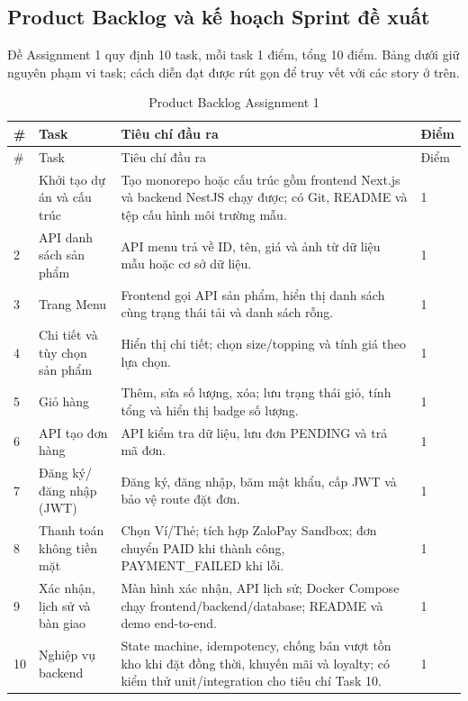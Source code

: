 \subsection{Product Backlog và kế hoạch Sprint đề xuất}
Đề Assignment 1 quy định 10 task, mỗi task 1 điểm, tổng 10 điểm. Bảng dưới giữ nguyên phạm vi task; cách diễn đạt được rút gọn để truy vết với các story ở trên.

\begin{longtable}{@{}p{0.55cm}p{3.15cm}p{9.9cm}p{1.05cm}@{}}
\caption{Product Backlog Assignment 1}\label{tab:a1-product-backlog}\\
\toprule
\# & Task & Tiêu chí đầu ra & Điểm \\
\midrule
\endfirsthead
\toprule \# & Task & Tiêu chí đầu ra & Điểm \\
\midrule
\endhead
\bottomrule
\endfoot
1 & Khởi tạo dự án và cấu trúc & Tạo monorepo hoặc cấu trúc gồm frontend Next.js và backend NestJS chạy được; có Git, README và tệp cấu hình môi trường mẫu. & 1 \\
2 & API danh sách sản phẩm & API menu trả về ID, tên, giá và ảnh từ dữ liệu mẫu hoặc cơ sở dữ liệu. & 1 \\
3 & Trang Menu & Frontend gọi API sản phẩm, hiển thị danh sách cùng trạng thái tải và danh sách rỗng. & 1 \\
4 & Chi tiết và tùy chọn sản phẩm & Hiển thị chi tiết; chọn size/topping và tính giá theo lựa chọn. & 1 \\
5 & Giỏ hàng & Thêm, sửa số lượng, xóa; lưu trạng thái giỏ, tính tổng và hiển thị badge số lượng. & 1 \\
6 & API tạo đơn hàng & API kiểm tra dữ liệu, lưu đơn PENDING và trả mã đơn. & 1 \\
7 & Đăng ký/đăng nhập (JWT) & Đăng ký, đăng nhập, băm mật khẩu, cấp JWT và bảo vệ route đặt đơn. & 1 \\
8 & Thanh toán không tiền mặt & Chọn Ví/Thẻ; tích hợp ZaloPay Sandbox; đơn chuyển PAID khi thành công, PAYMENT\_FAILED khi lỗi. & 1 \\
9 & Xác nhận, lịch sử và bàn giao & Màn hình xác nhận, API lịch sử; Docker Compose chạy frontend/backend/database; README và demo end-to-end. & 1 \\
10 & Nghiệp vụ backend & State machine, idempotency, chống bán vượt tồn kho khi đặt đồng thời, khuyến mãi và loyalty; có kiểm thử unit/integration cho tiêu chí Task 10. & 1 \\
\end{longtable}

